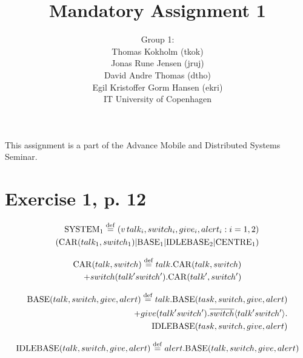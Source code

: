 \documentclass[11pt]{article}
\begin{document}
\title{Mandatory Assignment 1}
\author{Group 1:\\
Thomas Kokholm (tkok)\\
Jonas Rune Jensen (jruj)\\
David Andre Thomas (dtho)\\
Egil Kristoffer Gorm Hansen (ekri)\\
IT University of Copenhagen}
\renewcommand{\today}{September 22, 2012}
\maketitle
This assignment is a part of the Advance Mobile and Distributed Systems Seminar.

\section {Exercise 1, p. 12}


\begin{equation}
\begin{split}
{\rm SYSTEM_1} \stackrel{\mathrm{def}}{=} (v\,talk_i , switch_i , give_i , alert_i : i = 1,2) \\
({\rm CAR}(talk_1 , switch_1) | {\rm BASE_1} | {\rm IDLEBASE_2} | {\rm CENTRE_1})
\end{split}
\end{equation}

\begin{equation}
\begin{split}
{\rm CAR}(talk, switch) \stackrel{\rm def}{=} talk . {\rm CAR}(talk, switch) \\
+ switch(talk' switch') . {\rm CAR}(talk', switch')\\
\end{split}
\end{equation}

\begin{equation}
\begin{split}
{\rm BASE}(talk, switch, give, alert) \stackrel{\rm def}{=} talk . {\rm BASE}(task, switch, give, alert) \\
+ give(talk' switch') . \overline{switch} \langle talk' switch' \rangle . \\
{\rm IDLEBASE}(task, switch, give, alert)
\end{split}
\end{equation}

\begin{equation}
{\rm IDLEBASE}(talk, switch, give, alert) \stackrel{\mathrm{def}}{=} alert.{\rm BASE}(talk,switch,give,alert)
\end{equation}
\end{document}
